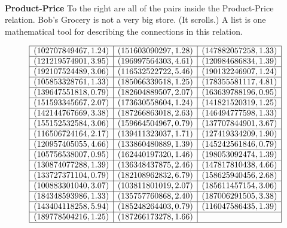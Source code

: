 \documentclass{ximera}
\begin{document}
\quad \\

\textbf{Product-Price}
To the right are all of the pairs inside the Product-Price relation.  Bob's Grocery is not a very big store. (It scrolls.)
A list is one mathematical tool for describing the connections in this relation.

\[
\begin{array}{|l|l|l|}
\hline
(102707849467, 1.24) & (151603090297, 1.28) & (147882057258, 1.33) \\\hline
(121219574901, 3.95) & (196997564303, 4.61) & (120984686834, 1.39) \\\hline
(192107524489, 3.06) & (116532522722, 5.46) & (190132246907, 1.24) \\\hline
(105853328761, 1.33) & (185066339518, 1.25) & (178355581117, 4.81) \\\hline 
(139647551818, 0.79) & (182604889507, 2.07) & (163639788196, 0.95) \\\hline 
(151593345667, 2.07) & (173630558604, 1.24) & (141821520319, 1.25) \\\hline 
(142144767669, 3.38) & (187266863018, 2.63) & (146494777598, 1.33) \\\hline 
(155152532584, 3.06) & (159664504967, 0.79) & (137707844901, 3.67) \\\hline 
(116506724164, 2.17) & (139411323037, 1.71) & (127419334209, 1.90) \\\hline 
(120957405055, 4.66) & (133860480889, 1.39) & (145242561846, 0.79) \\\hline 
(105756538007, 0.95) & (162440197320, 1.46) & (198053092474, 1.39) \\\hline 
(130874077288, 1.39) & (136348437875, 2.46) & (147817810438, 4.66) \\\hline 
(133727371104, 0.79) & (182108962832, 6.79) & (158625940456, 2.68) \\\hline 
(100883301040, 3.07) & (103811801019, 2.07) & (185611457154, 3.06) \\\hline 
(184348593986, 1.33) & (135757760868, 2.40) & (187006291505, 3.38) \\\hline 
(143404118258, 5.94) & (185248264403, 0.79) & (116047586435, 1.39) \\\hline 
(189778504216, 1.25) & (187266173278, 1.66) &    \\\hline
\end{array}
\]
\end{document}
